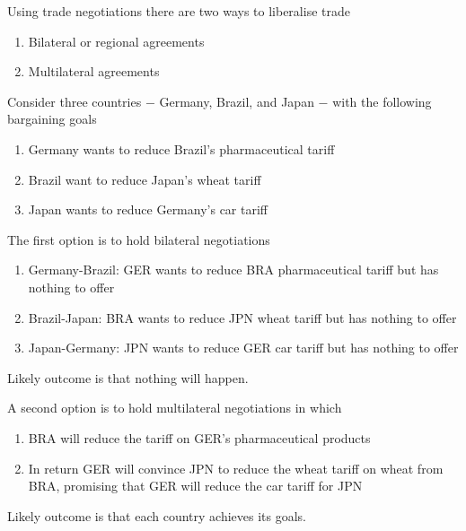 \documentclass{beamer}
\begin{document}
\begin{frame}
  Using trade negotiations there are two ways to liberalise trade
  \begin{enumerate}
    \item Bilateral or regional agreements
    \item Multilateral agreements
  \end{enumerate}  
\end{frame}

\begin{frame}
  Consider three countries $-$ Germany, Brazil, and Japan $-$ with the following bargaining goals
  \medskip
  \begin{enumerate}
    \item Germany wants to reduce Brazil's pharmaceutical tariff
    \item Brazil want to reduce Japan's wheat tariff
    \item Japan wants to reduce Germany's car tariff
  \end{enumerate}
\end{frame}

\begin{frame}
  The first option is to hold bilateral negotiations
  \begin{enumerate}
    \item Germany-Brazil: GER wants to reduce BRA pharmaceutical tariff but has nothing to offer
    \item Brazil-Japan: BRA wants to reduce JPN wheat tariff but has nothing to offer
    \item Japan-Germany: JPN wants to reduce GER car tariff but has nothing to offer
  \end{enumerate}
  \medskip
  Likely outcome is that nothing will happen.  
\end{frame}

\begin{frame}
  A second option is to hold multilateral negotiations in which
  \begin{enumerate}
    \item BRA will reduce the tariff on GER's pharmaceutical products
    \item In return GER will convince JPN to reduce the wheat tariff on wheat from BRA, promising that GER will reduce the car tariff for JPN
  \end{enumerate}
  \medskip
  Likely outcome is that each country achieves its goals. 
\end{frame}
\end{document}

